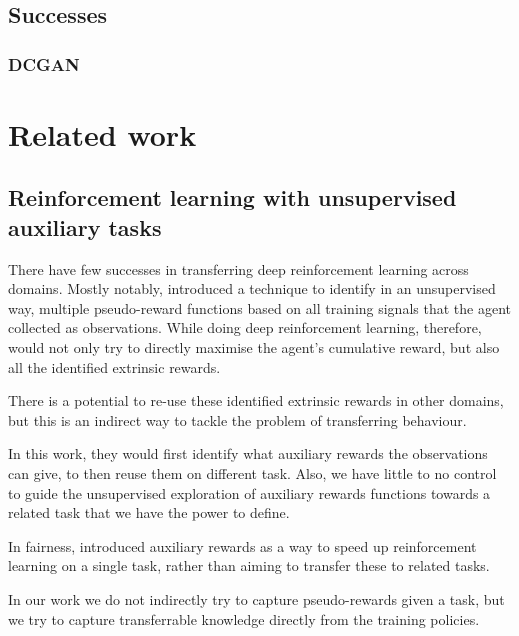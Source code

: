 \subsection{Successes}
\label{successes}
\subsubsection{DCGAN}



\section{Related work}
\subsection{Reinforcement learning with unsupervised auxiliary tasks}
There have few successes in transferring deep reinforcement learning across domains. Mostly notably, \cite{jaderberg2016reinforcement} introduced a technique to identify in an unsupervised way, multiple pseudo-reward functions based on all training signals that the agent collected as observations. While doing deep reinforcement learning, therefore, \citeauthor{jaderberg2016reinforcement} would not only try to directly maximise the agent's cumulative reward, but also all the identified extrinsic rewards. 

There is a potential to re-use these identified extrinsic rewards in other domains, but this is an indirect way to tackle the problem of transferring behaviour. 

In this work, they would first identify what auxiliary rewards the observations can give, to then reuse them on different task. Also, we have little to no control to guide the unsupervised exploration of auxiliary rewards functions towards a related task that we have the power to define.

In fairness, \citeauthor{jaderberg2016reinforcement} introduced auxiliary rewards as a way to speed up reinforcement learning on a single task, rather than aiming to transfer these to related tasks.

In our work we do not indirectly try to capture pseudo-rewards given a task, but we try to capture transferrable knowledge directly from the training policies.


